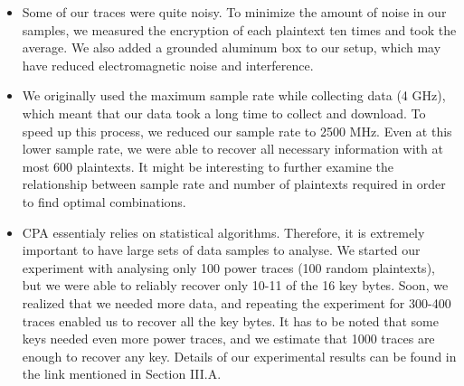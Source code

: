 \documentclass[journal]{ieee_style}
\begin{document}
\begin{itemize}
\item Some of our traces were quite noisy. To minimize the amount of noise in our samples, we measured the encryption of each plaintext ten times and took the average. We also added a grounded aluminum box to our setup, which may have reduced electromagnetic noise and interference.
\item We originally used the maximum sample rate while collecting data (4 GHz), which meant that our data took a long time to collect and download. To speed up this process, we reduced our sample rate to 2500 MHz. Even at this lower sample rate, we were able to recover all necessary information with at most 600 plaintexts. It might be interesting to further examine the relationship between sample rate and number of plaintexts required in order to find optimal combinations.
\item CPA essentialy relies on statistical algorithms. Therefore, it is extremely important to have large sets of data samples to analyse. We started our experiment with analysing only 100 power traces (100 random plaintexts), but we were able to reliably recover only 10-11 of the 16 key bytes. Soon, we realized that we needed more data, and repeating the experiment for 300-400 traces enabled us to recover all the key bytes. It has to be noted that some keys needed even more power traces, and we estimate that 1000 traces are enough to recover any key. Details of our experimental results can be found in the link mentioned in Section III.A.
\end{itemize}
\end{document}
